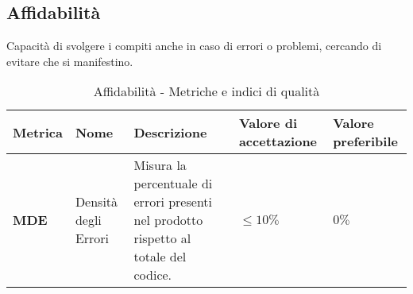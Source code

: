 \subsection{Affidabilità}
Capacità di svolgere i compiti anche in caso di errori o problemi, cercando di evitare che si manifestino.
\begin{table}[H]
    \centering
    \begin{tabular}{|C{1.5cm}|L{3cm}|L{4cm}|L{2.5cm}|L{2.5cm}|}
        \hline
        \textbf{Metrica} & \textbf{Nome} & \textbf{Descrizione} & \textbf{Valore di accettazione} & \textbf{Valore preferibile} \\
        \hline
        \textbf{MDE} & Densità degli Errori & Misura la percentuale di errori presenti nel prodotto rispetto al totale del codice. & $\leq 10\%$ & $0\%$ \\
        \hline
    \end{tabular}
    \caption{Affidabilità - Metriche e indici di qualità}
    \label{tab:affidabilità_qualita_prodotto}
\end{table}
